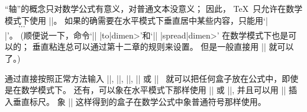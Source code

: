 \ddanger ``轴''的概念只对数学公式有意义，对普通文本没意义；
因此， \TeX\ 只允许在数学模式下使用 |\vcenter|。%
如果的确需要在水平模式下垂直居中某些内容，只能用`|$\vcenter{...}$|'。%
(顺便说一下，命令`|\vcenter| |to|\<dimen>'和`|\vcenter| |spread|\<dimen>'%
在数学模式下也是可以的；
垂直粘连总可以通过第十二章的规则来设置。%
但是一般直接用 |\vcenter| 就可以了。)

\danger 通过直接按照正常方法输入 |\hbox|, |\vbox|, |\vtop|, |\box| 或 |\copy|~%
就可以把任何盒子放在公式中，即使是在数学模式下。%
还有，可以象在水平模式下那样使用 |\raise| 或 |\lower|,
并且可以用 |\vrule| 插入垂直标尺。%
象 |\vcenter| 这样得到的盒子在数学公式中象普通符号那样使用。

